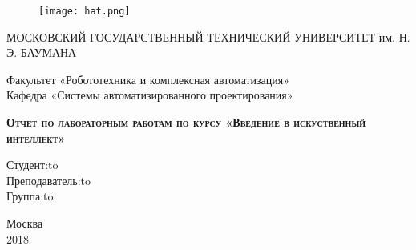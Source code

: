 \begin{titlepage}
\newpage

\begin{figure}[!htb]
\centering
\texttt{[image: hat.png]}
\end{figure}

\begin{center}
МОСКОВСКИЙ ГОСУДАРСТВЕННЫЙ ТЕХНИЧЕСКИЙ
УНИВЕРСИТЕТ им. Н. Э. БАУМАНА \\
\end{center}

\vspace{6em}

\begin{center}
\Large Факультет «Робототехника и комплексная автоматизация» \\
\Large Кафедра «Системы автоматизированного проектирования» \\ 
\end{center}

\vspace{2em}

\begin{center}
\textsc{\textbf{Отчет по лабораторным работам по курсу
 \linebreak «Введение в искуственный интеллект»}}
\end{center}

\vspace{16em}



\newbox{\lbox}
\newlength{\maxl}
\setlength{\maxl}{\wd\lbox}
\hfill\parbox{11cm}{
\hspace*{1cm}Студент:\hfill\hbox to\hspace*{1cm}\\
\hspace*{1cm}Преподаватель:\hfill\hbox to\hspace*{1cm}\\
\hspace*{1cm}Группа:\hfill\hbox to\hspace*{1cm}\\
}


\vspace{\fill}

\begin{center}
Москва \\2018
\end{center}

\end{titlepage}
